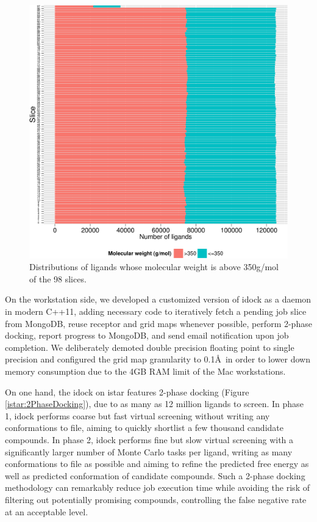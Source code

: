 \begin{figure}
\centering
\includegraphics[width=\linewidth]{istar/gt350.pdf}
\caption{Distributions of ligands whose molecular weight is above 350g/mol of the 98 slices.}
\label{istar:gt350}
\end{figure}

On the workstation side, we developed a customized version of idock as a daemon in modern C++11, adding necessary code to iteratively fetch a pending job slice from MongoDB, reuse receptor and grid maps whenever possible, perform 2-phase docking, report progress to MongoDB, and send email notification upon job completion. We deliberately demoted double precision floating point to single precision and configured the grid map granularity to 0.1\AA\ in order to lower down memory consumption due to the 4GB RAM limit of the Mac workstations.

On one hand, the idock on istar features 2-phase docking (Figure \ref{istar:2PhaseDocking}), due to as many as 12 million ligands to screen. In phase 1, idock performs coarse but fast virtual screening without writing any conformations to file, aiming to quickly shortlist a few thousand candidate compounds. In phase 2, idock performs fine but slow virtual screening with a significantly larger number of Monte Carlo tasks per ligand, writing as many conformations to file as possible and aiming to refine the predicted free energy as well as predicted conformation of candidate compounds. Such a 2-phase docking methodology can remarkably reduce job execution time while avoiding the risk of filtering out potentially promising compounds, controlling the false negative rate at an acceptable level.

